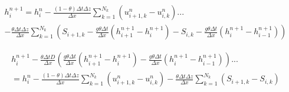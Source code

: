 \documentclass[12pt]{article}
\begin{document}
\begin{multline*}
h_{i}^{n+1} = h_i^n  - \frac{(1-\theta) \Delta t \Delta z}{\Delta x} \sum_{k=1}^{N_k} (u_{i+1,k}^n - u_{i,k}^n) ...
\\ 
- \frac{\theta \Delta t \Delta z}{\Delta x} \sum_{k=1}^{N_k} \left( S_{i+1,k} - \frac{g \theta \Delta t}{\Delta x} (h_{i+1}^{n+1} - h_{i}^{n+1}) - S_{i,k} - \frac{g \theta \Delta t}{\Delta x} (h_{i}^{n+1} - h_{i-1}^{n+1}) \right)
\end{multline*}

\begin{multline*}
h_{i}^{n+1} - \frac{\theta \Delta t D}{\Delta x} \left(\frac{g \theta \Delta t}{\Delta x} (h_{i+1}^{n+1} - h_{i}^{n+1}) - \frac{g \theta \Delta t}{\Delta x} (h_{i}^{n+1} - h_{i-1}^{n+1}) \right) ... 
\\= h_i^n  - \frac{(1-\theta) \Delta t \Delta z}{\Delta x} \sum_{k=1}^{N_k} (u_{i+1,k}^n - u_{i,k}^n) - \frac{\theta \Delta t \Delta z}{\Delta x} \sum_{k=1}^{N_k} ( S_{i+1,k} - S_{i,k} )
\end{multline*}


\section{}

\section{}

\section{}

\section{}
\end{document}
